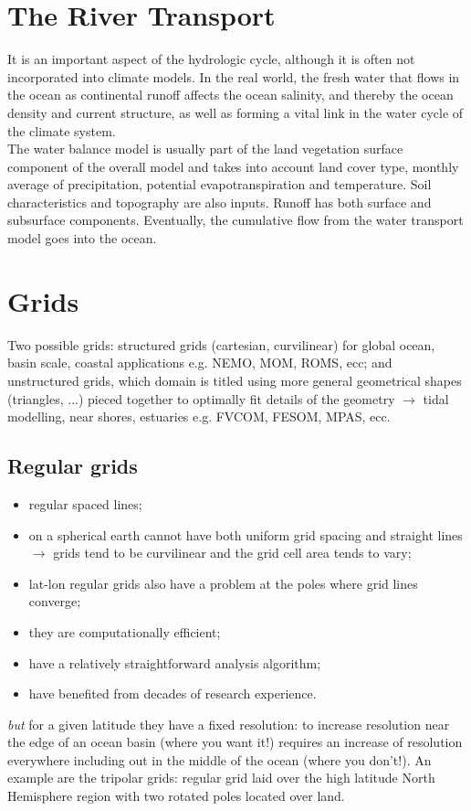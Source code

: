 \section{The River Transport}

It is an important aspect of the hydrologic cycle, although it is often not incorporated into climate models. In the real world, the fresh water that flows in the ocean as continental runoff affects the ocean salinity, and thereby the ocean density and current structure, as well as forming a vital link in the water cycle of the climate system.\\




The water balance model is usually  part of the land vegetation surface component of the overall model and takes into account land cover type, monthly average of precipitation, potential evapotranspiration and temperature. Soil characteristics and topography are also inputs. Runoff has both surface and subsurface components. Eventually, the cumulative flow from the water transport model goes into the ocean.

\section{Grids}
Two possible grids: structured grids (cartesian, curvilinear) for global ocean, basin scale, coastal applications e.g. NEMO, MOM, ROMS, ecc; and unstructured grids, which domain is titled using more general geometrical shapes (triangles, ...) pieced together to optimally fit details of the geometry $\rightarrow$ tidal modelling, near shores, estuaries e.g. FVCOM, FESOM, MPAS, ecc.
\subsection{Regular grids}
\begin{itemize}
	\item regular spaced lines;
	\item on a spherical earth cannot have both uniform grid spacing and straight lines $\rightarrow$ grids tend to be curvilinear and the grid cell area tends to vary;
	\item lat-lon regular grids also have a problem at the poles where grid lines converge;
	\item they are computationally efficient;
	\item have a relatively straightforward analysis algorithm;
	\item have benefited from decades of research experience.
\end{itemize}
\textit{but} for a given latitude they have a fixed resolution: to increase resolution near the edge of an ocean basin (where you want it!) requires an increase of resolution everywhere including out in the middle of the ocean (where you don't!). An example are the tripolar grids: regular grid laid over the high latitude North Hemisphere region with two rotated poles located over land.
